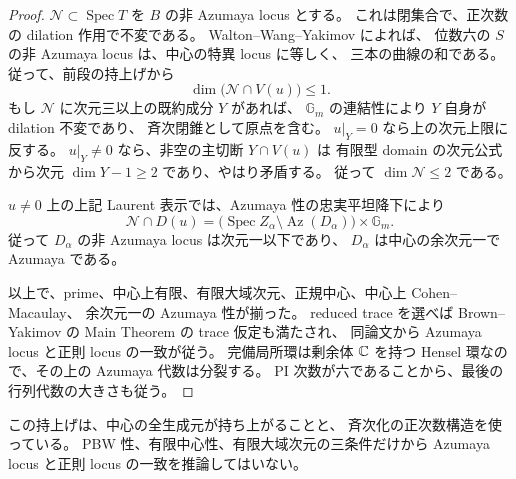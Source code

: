\begin{proof}
$\mathcal N\subset\operatorname{Spec}T$ を $B$ の非 Azumaya locus とする。
これは閉集合で、正次数の dilation 作用で不変である。
Walton--Wang--Yakimov
\cite[Theorem~1.3(1), Lemma~5.4]{CMOWaltonWangYakimov}によれば、
位数六の $S$ の非 Azumaya locus は、中心の特異 locus に等しく、
三本の曲線の和である。従って、前段の持上げから
\[
 \dim\bigl(\mathcal N\cap V(u)\bigr)\leq1.
\]
もし $\mathcal N$ に次元三以上の既約成分 $Y$ があれば、
$\mathbb G_m$ の連結性により $Y$ 自身が dilation 不変であり、
斉次閉錐として原点を含む。
$u|_Y=0$ なら上の次元上限に反する。
$u|_Y\ne0$ なら、非空の主切断 $Y\cap V(u)$ は
有限型 domain の次元公式から次元 $\dim Y-1\geq2$ であり、やはり矛盾する。
従って $\dim\mathcal N\leq2$ である。

$u\ne0$ 上の上記 Laurent 表示では、Azumaya 性の忠実平坦降下により
\[
 \mathcal N\cap D(u)=
       \bigl(\operatorname{Spec}Z_\alpha\setminus
                     \operatorname{Az}(D_\alpha)\bigr)\times\mathbb G_m.
\]
従って $D_\alpha$ の非 Azumaya locus は次元一以下であり、
$D_\alpha$ は中心の余次元一で Azumaya である。

以上で、prime、中心上有限、有限大域次元、正規中心、中心上 Cohen--Macaulay、
余次元一の Azumaya 性が揃った。
reduced trace を選べば Brown--Yakimov の Main Theorem の trace 仮定も満たされ、
同論文\cite[Corollary~5.2]{CMOBrownYakimov}から
Azumaya locus と正則 locus の一致が従う。
完備局所環は剰余体 $\mathbb C$ を持つ Hensel 環なので、その上の Azumaya 代数は分裂する。
PI 次数が六であることから、最後の行列代数の大きさも従う。
\end{proof}

\begin{remark}
この持上げは、中心の全生成元が持ち上がることと、
斉次化の正次数構造を使っている。
PBW 性、有限中心性、有限大域次元の三条件だけから
Azumaya locus と正則 locus の一致を推論してはいない。
\end{remark}
